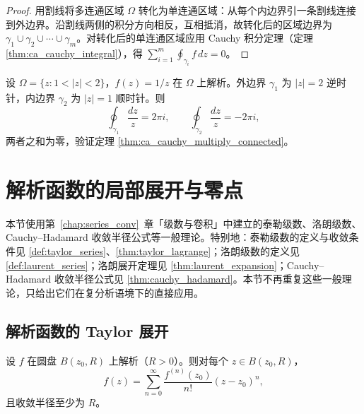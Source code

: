 \begin{proof}
用割线将多连通区域 $\Omega$ 转化为单连通区域：从每个内边界引一条割线连接到外边界。沿割线两侧的积分方向相反，互相抵消，故转化后的区域边界为 $\gamma_1 \cup \gamma_2 \cup \cdots \cup \gamma_m$。对转化后的单连通区域应用 Cauchy 积分定理（定理 \ref{thm:ca_cauchy_integral}），得 $\sum_{i=1}^{m} \oint_{\gamma_i} f \, dz = 0$。
\end{proof}

\begin{example}\label{ex:ca_multiply_connected}
设 $\Omega = \{z : 1 < |z| < 2\}$，$f(z) = 1/z$ 在 $\Omega$ 上解析。外边界 $\gamma_1$ 为 $|z| = 2$ 逆时针，内边界 $\gamma_2$ 为 $|z| = 1$ 顺时针。则
\[
\oint_{\gamma_1} \frac{dz}{z} = 2\pi i, \qquad \oint_{\gamma_2} \frac{dz}{z} = -2\pi i,
\]
两者之和为零，验证定理 \ref{thm:ca_cauchy_multiply_connected}。
\end{example}

\section{解析函数的局部展开与零点}

\begin{remark}\label{rem:ca_series_interface}
本节使用第~\ref{chap:series_conv}~章「级数与卷积」中建立的泰勒级数、洛朗级数、Cauchy--Hadamard 收敛半径公式等一般理论。特别地：泰勒级数的定义与收敛条件见 \cref{def:taylor_series}、\cref{thm:taylor_lagrange}；洛朗级数的定义见 \cref{def:laurent_series}；洛朗展开定理见 \cref{thm:laurent_expansion}；Cauchy--Hadamard 收敛半径公式见 \cref{thm:cauchy_hadamard}。本节不再重复这些一般理论，只给出它们在复分析语境下的直接应用。
\end{remark}

\subsection{解析函数的 Taylor 展开}

\begin{theorem}\label{thm:ca_taylor_expansion}
设 $f$ 在圆盘 $B(z_0, R)$ 上解析（$R > 0$）。则对每个 $z \in B(z_0, R)$，
\[
f(z) = \sum_{n=0}^{\infty} \frac{f^{(n)}(z_0)}{n!} (z - z_0)^n,
\]
且收敛半径至少为 $R$。
\end{theorem}

